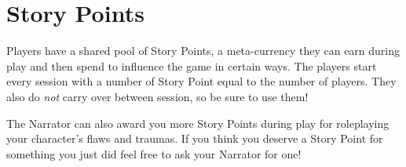 


\chapter{Story Points}

Players have a shared pool of Story Points, 
a meta-currency they can earn during play and then spend to influence the game in certain ways.
The players start every session with a number of Story Point equal to the number of players. 
They also do \textit{not} carry over between session, so be sure to use them!

The Narrator can also award you more Story Points during play for roleplaying your character's flaws and traumas. If you think you deserve a Story Point for something you just did feel free to ask your Narrator for one!

